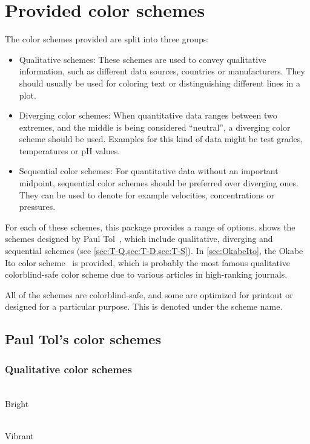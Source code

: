 \documentclass{scrartcl}
\begin{document}
\section{Provided color schemes}\label{sec:colors}
The color schemes provided are split into three groups:
\begin{itemize}
    \item Qualitative schemes:\newline
        These schemes are used to convey qualitative information, such as different data sources, countries or manufacturers.
        They should usually be used for coloring text or distinguishing different lines in a plot.
    \item Diverging color schemes:\newline
        When quantitative data ranges between two extremes, and the middle is being considered ``neutral'', a diverging color scheme should be used.
        Examples for this kind of data might be test grades, temperatures or pH values.
    \item Sequential color schemes:\newline
        For quantitative data without an important midpoint, sequential color schemes should be preferred over diverging ones.
        They can be used to denote for example velocities, concentrations or pressures.
\end{itemize}

For each of these schemes, this package provides a range of options.
 shows the schemes designed by Paul Tol~\cite{Tol}, which include qualitative, diverging and sequential schemes (see \cref{sec:T-Q,sec:T-D,sec:T-S}).
In \cref{sec:OkabeIto}, the Okabe Ito color scheme~\cite{Ichihara_2008} is provided, which is probably the most famous qualitative colorblind-safe color scheme due to various articles in high-ranking journals.

All of the schemes are colorblind-safe, and some are optimized for printout or designed for a particular purpose.
This is denoted under the scheme name.\clearpage

\subsection{Paul Tol's color schemes}\label{sec:Tol_schemes}

\subsubsection{Qualitative color schemes}\label{sec:T-Q}
\begin{minipage}{0.5\textwidth}
    \centering
    \\
    Bright\\
    \phantom{pb}
\end{minipage}\hfill%
\begin{minipage}{0.5\textwidth}
    \centering
    \\
    Vibrant
\end{minipage}
\end{document}
